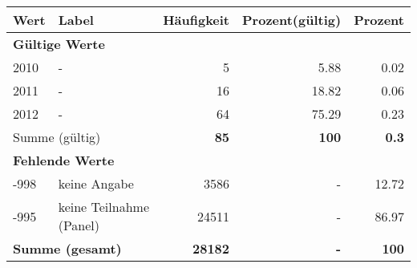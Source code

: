      \begin{longtable}{lXrrr}
     \toprule
     \textbf{Wert} & \textbf{Label} & \textbf{Häufigkeit} & \textbf{Prozent(gültig)} & \textbf{Prozent} \\
     \endhead
     \midrule
     \multicolumn{5}{l}{\textbf{Gültige Werte}}\\

     2010 &
     \multicolumn{1}{X}{ -  } &


       \num{5} &
       \num[round-mode=places,round-precision=2]{5,88} &
         \num[round-mode=places,round-precision=2]{0,02} \\

     2011 &
     \multicolumn{1}{X}{ -  } &


       \num{16} &
       \num[round-mode=places,round-precision=2]{18,82} &
         \num[round-mode=places,round-precision=2]{0,06} \\

     2012 &
     \multicolumn{1}{X}{ -  } &


       \num{64} &
       \num[round-mode=places,round-precision=2]{75,29} &
         \num[round-mode=places,round-precision=2]{0,23} \\
     \midrule
     \multicolumn{2}{l}{Summe (gültig)} &
       \textbf{\num{85}} &
     \textbf{100} &
       \textbf{\num[round-mode=places,round-precision=2]{0,3}} \\
     \multicolumn{5}{l}{\textbf{Fehlende Werte}}\\
       -998 &
       keine Angabe &
         \num{3586} &
        - &
         \num[round-mode=places,round-precision=2]{12,72} \\
       -995 &
       keine Teilnahme (Panel) &
         \num{24511} &
        - &
         \num[round-mode=places,round-precision=2]{86,97} \\
     \midrule
     \multicolumn{2}{l}{\textbf{Summe (gesamt)}} &
          \textbf{\num{28182}} &
        \textbf{-} &
        \textbf{100} \\
     \bottomrule
     \end{longtable}
     
